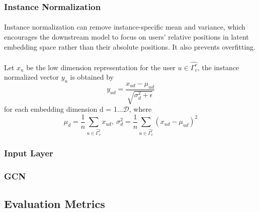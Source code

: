 \subsubsection{Instance Normalization}
\paragraph{} Instance normalization can remove instance-specific mean and variance, which encourages the downstream model 
to focus on users’ relative positions in latent embedding space rather than their absolute positions. It also prevents 
overfitting.
\paragraph{} Let $x_u$ be the low dimension representation for the user $u \in \hat{\Gamma_v^r}$, the instance normalized
vector $y_u$ is obtained by
\begin{equation}
    y_{ud} = \frac{x_{ud}-\mu_{ud}}{\sqrt{\sigma_d^2+\epsilon}}
\end{equation}
for each embedding dimension d = 1...$\mathcal{D}$, where
\begin{equation}
    \mu_d = \frac{1}{n}\sum_{u \in \hat{\Gamma_v^r}}x_{ud},\ \sigma_d^2 = \frac{1}{n}\sum_{u \in \hat{\Gamma_v^r}}(x_{ud}-\mu_{ud})^2
\end{equation}
\subsubsection{Input Layer}
\subsubsection{GCN}
\subsection{Evaluation Metrics}